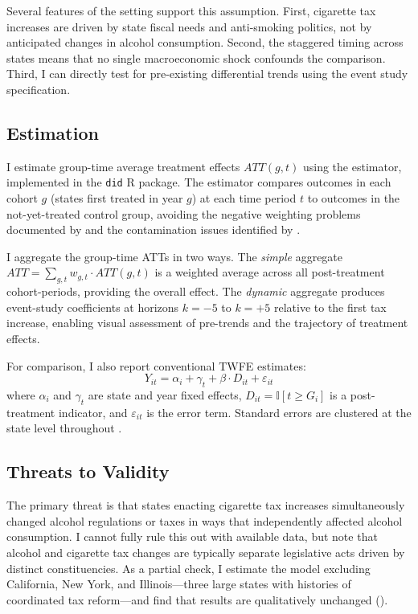 \documentclass[12pt]{article}
\newcommand{\ind}{\mathbb{I}}
\begin{document}
Several features of the setting support this assumption. First, cigarette tax increases are driven by state fiscal needs and anti-smoking politics, not by anticipated changes in alcohol consumption. Second, the staggered timing across states means that no single macroeconomic shock confounds the comparison. Third, I can directly test for pre-existing differential trends using the event study specification.

\subsection{Estimation}

I estimate group-time average treatment effects $ATT(g,t)$ using the \citet{callaway2021difference} estimator, implemented in the \texttt{did} R package. The estimator compares outcomes in each cohort $g$ (states first treated in year $g$) at each time period $t$ to outcomes in the not-yet-treated control group, avoiding the negative weighting problems documented by \citet{goodman2021difference} and the contamination issues identified by \citet{sun2021estimating}.

I aggregate the group-time ATTs in two ways. The \textit{simple} aggregate $ATT = \sum_{g,t} w_{g,t} \cdot ATT(g,t)$ is a weighted average across all post-treatment cohort-periods, providing the overall effect. The \textit{dynamic} aggregate produces event-study coefficients at horizons $k = -5$ to $k = +5$ relative to the first tax increase, enabling visual assessment of pre-trends and the trajectory of treatment effects.

For comparison, I also report conventional TWFE estimates:
\begin{equation}
Y_{it} = \alpha_i + \gamma_t + \beta \cdot D_{it} + \varepsilon_{it}
\end{equation}
where $\alpha_i$ and $\gamma_t$ are state and year fixed effects, $D_{it} = \ind[t \geq G_i]$ is a post-treatment indicator, and $\varepsilon_{it}$ is the error term. Standard errors are clustered at the state level throughout \citep{roth2023s}.

\subsection{Threats to Validity}

The primary threat is that states enacting cigarette tax increases simultaneously changed alcohol regulations or taxes in ways that independently affected alcohol consumption. I cannot fully rule this out with available data, but note that alcohol and cigarette tax changes are typically separate legislative acts driven by distinct constituencies. As a partial check, I estimate the model excluding California, New York, and Illinois---three large states with histories of coordinated tax reform---and find that results are qualitatively unchanged ().
\end{document}
